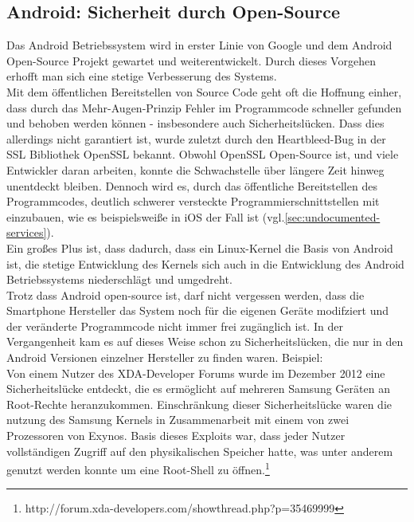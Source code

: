 \subsection{Android: Sicherheit durch Open-Source}
\label{sec:Android_Sicherheit_Open_Source} Das Android Betriebssystem wird in erster Linie von Google und dem Android Open-Source Projekt gewartet und weiterentwickelt. Durch dieses Vorgehen erhofft man sich eine stetige Verbesserung des Systems. \\
Mit dem öffentlichen Bereitstellen von Source Code geht oft die Hoffnung einher, dass durch das Mehr-Augen-Prinzip Fehler im Programmcode schneller gefunden und behoben werden können - insbesondere auch Sicherheitslücken.
Dass dies allerdings nicht garantiert ist, wurde zuletzt durch den Heartbleed-Bug in der SSL Bibliothek OpenSSL bekannt. Obwohl OpenSSL Open-Source ist, und viele Entwickler daran arbeiten, konnte die Schwachstelle über längere Zeit hinweg unentdeckt bleiben. Dennoch wird es, durch das öffentliche Bereitstellen des Programmcodes, deutlich schwerer versteckte Programmierschnittstellen mit einzubauen, wie es beispielsweiße in iOS der Fall ist (vgl.\ref{sec:undocumented-services}).\\
Ein großes Plus ist, dass dadurch, dass ein Linux-Kernel die Basis von Android ist, die stetige Entwicklung des Kernels sich auch in die Entwicklung des Android Betriebssystems niederschlägt und umgedreht.\\
Trotz dass Android open-source ist, darf nicht vergessen werden, dass die Smartphone Hersteller das System noch für die eigenen Geräte modifziert und der veränderte Programmcode nicht immer frei zugänglich ist. In der Vergangenheit kam es auf dieses Weise schon zu Sicherheitslücken, die nur in den Android Versionen einzelner Hersteller zu finden waren. Beispiel:\\
Von einem Nutzer des XDA-Developer Forums wurde im Dezember 2012 eine Sicherheitslücke entdeckt, die es ermöglicht auf mehreren Samsung Geräten an Root-Rechte heranzukommen. Einschränkung dieser Sicherheitslücke waren die nutzung des Samsung Kernels in Zusammenarbeit mit einem von zwei Prozessoren von Exynos. Basis dieses Exploits war, dass jeder Nutzer vollständigen Zugriff auf den physikalischen Speicher hatte, was unter anderem genutzt werden konnte um eine Root-Shell zu öffnen.\footnote{http://forum.xda-developers.com/showthread.php?p=35469999} \\
